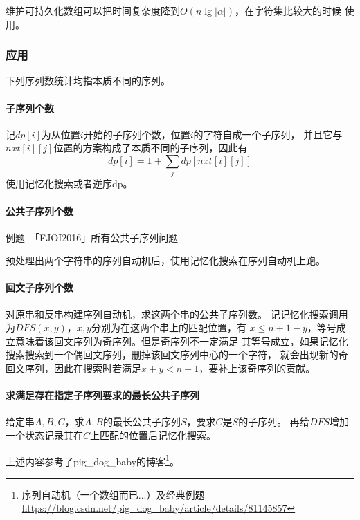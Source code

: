 维护可持久化数组可以把时间复杂度降到$O(n\lg |\alpha|)$，在字符集比较大的时候
使用。
\subsubsection{应用}
下列序列数统计均指本质不同的序列。
\paragraph{子序列个数}
记$dp[i]$为从位置$i$开始的子序列个数，位置$i$的字符自成一个子序列，
并且它与$nxt[i][j]$位置的方案构成了本质不同的子序列，因此有
\begin{displaymath}
    dp[i]=1+\sum_j{dp[nxt[i][j]]}
\end{displaymath}
使用记忆化搜索或者逆序dp。
\paragraph{公共子序列个数}
例题~「FJOI2016」所有公共子序列问题

预处理出两个字符串的序列自动机后，使用记忆化搜索在序列自动机上跑。
\paragraph{回文子序列个数}
对原串和反串构建序列自动机，求这两个串的公共子序列数。
记记忆化搜索调用为$DFS(x,y)$，$x,y$分别为在这两个串上的匹配位置，有
$x\leq n+1-y$，等号成立意味着该回文序列为奇序列。但是奇序列不一定满足
其等号成立，如果记忆化搜索搜索到一个偶回文序列，删掉该回文序列中心的一个字符，
就会出现新的奇回文序列，因此在搜索时若满足$x+y<n+1$，要补上该奇序列的贡献。
\paragraph{求满足存在指定子序列要求的最长公共子序列}
给定串$A,B,C$，求$A,B$的最长公共子序列$S$，要求$C$是$S$的子序列。
再给$DFS$增加一个状态记录其在$C$上匹配的位置后记忆化搜索。

上述内容参考了pig\_dog\_baby的博客\footnote{
    序列自动机（一个数组而已...）及经典例题
    \url{https://blog.csdn.net/pig\_dog\_baby/article/details/81145857}
}。
